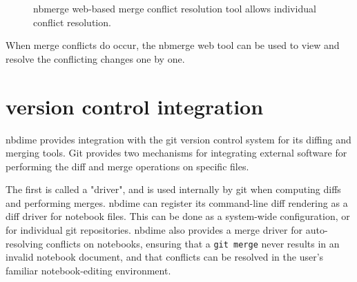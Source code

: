 \documentclass{deliverablereport}
\begin{document}
\begin{figure}
    \center
    \caption{nbmerge web-based merge conflict resolution tool allows individual conflict resolution.}
    \label{fig:nbmerge-web}
\end{figure}

When merge conflicts do occur, the nbmerge web tool can be used to view and resolve the conflicting changes one by one.



\section{version control integration} %
\label{sub:version_control_integration}

nbdime provides integration with the git version control system for its diffing and merging tools.
Git provides two mechanisms for integrating external software for
performing the diff and merge operations on specific files.

The first is called a "driver", and is used internally by git when computing diffs and performing merges. nbdime can register its command-line diff rendering as a diff driver for notebook files.
This can be done as a system-wide configuration, or for individual git repositories.
nbdime also provides a merge driver for auto-resolving conflicts on notebooks,
ensuring that a \texttt{git merge} never results in an invalid notebook document,
and that conflicts can be resolved in the user's familiar notebook-editing environment.
\end{document}
